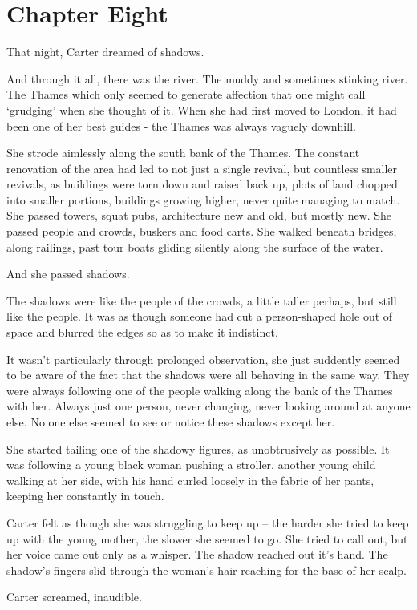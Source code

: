 \chapter*{Chapter Eight}

That night, Carter dreamed of shadows.

And through it all, there was the river.  The muddy and sometimes stinking river.  The Thames which only seemed to generate affection that one might call `grudging' when she thought of it.  When she had first moved to London, it had been one of her best guides - the Thames was always vaguely downhill.

She strode aimlessly along the south bank of the Thames.  The constant renovation of the area had led to not just a single revival, but countless smaller revivals, as buildings were torn down and raised back up, plots of land chopped into smaller portions, buildings growing higher, never quite managing to match.  She passed towers, squat pubs, architecture new and old, but mostly new.  She passed people and crowds, buskers and food carts.  She walked beneath bridges, along railings, past tour boats gliding silently along the surface of the water.

And she passed shadows.

The shadows were like the people of the crowds, a little taller perhaps, but still like the people.  It was as though someone had cut a person-shaped hole out of space and blurred the edges so as to make it indistinct.

It wasn't particularly through prolonged observation, she just suddently seemed to be aware of the fact that the shadows were all behaving in the same way.  They were always following one of the people walking along the bank of the Thames with her.  Always just one person, never changing, never looking around at anyone else.  No one else seemed to see or notice these shadows except her.

She started tailing one of the shadowy figures, as unobtrusively as possible.  It was following a young black woman pushing a stroller, another young child walking at her side, with his hand curled loosely in the fabric of her pants, keeping her constantly in touch.

Carter felt as though she was struggling to keep up -- the harder she tried to keep up with the young mother, the slower she seemed to go.  She tried to call out, but her voice came out only as a whisper.  The shadow reached out it's hand.  The shadow's fingers slid through the woman's hair reaching for the base of her scalp.

Carter screamed, inaudible.

\secdiv
